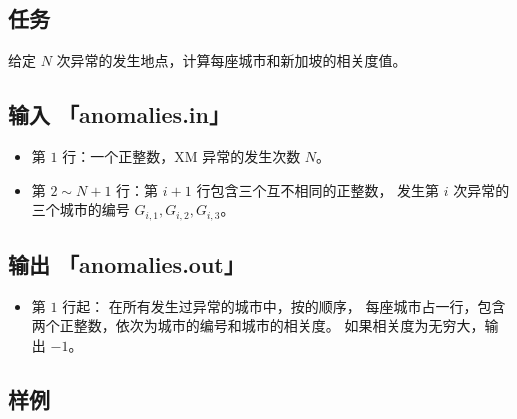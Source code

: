 \documentclass[UTF8, 11pt, a4paper]{article}
\begin{document}
\subsection*{任务}
给定 $N$ 次异常的发生地点，计算每座城市和新加坡的相关度值。

\subsection*{输入 \makebox[0.5em]{} \small{「anomalies.in」}}
\begin{itemize}
    \item 第 $1$ 行：一个正整数，XM 异常的发生次数 $N$。
    \item 第 $2 \sim N+1$ 行：第 $i+1$ 行包含三个互不相同的正整数，%
        发生第 $i$ 次异常的三个城市的编号 $G_{i,1}, G_{i,2}, G_{i,3}$。
\end{itemize}

\subsection*{输出 \makebox[0.5em]{} \small{「anomalies.out」}}
\begin{itemize}
    \item 第 $1$ 行起：%
        在所有发生过异常的城市中，按的顺序，%
        每座城市占一行，包含两个正整数，依次为城市的编号和城市的相关度。%
        如果相关度为无穷大，输出 $-1$。
\end{itemize}
\newpage

\subsection*{样例}
\end{document}

